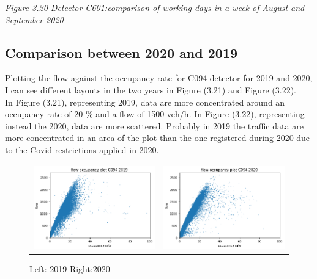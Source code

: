\documentclass[11pt]{article}
\begin{document}
\emph{\small Figure 3.20 Detector C601:comparison of working days in a week of August and September 2020}

    \subsection{Comparison between 2020 and 2019}

    Plotting the flow against the occupancy rate for C094 detector for 2019
and 2020, I can see different layouts in the two years in Figure (3.21)
and Figure (3.22).\\
In Figure (3.21), representing 2019, data are more concentrated around
an occupancy rate of 20 \(\%\) and a flow of 1500 veh/h. In Figure
(3.22), representing instead the 2020, data are more scattered. Probably
in 2019 the traffic data are more concentrated in an area of the plot
than the one registered during 2020 due to the Covid restrictions
applied in 2020.

    \begin{figure}
\begin{tabular}{ll}
\includegraphics[scale=0.5]{FD C094 2019.png}
&
\includegraphics[scale=0.5]{FD C094 2020.png}
\end{tabular}
\caption{Left: 2019 
Right:2020}
\label{Fig:Race}
\end{figure}
\end{document}
